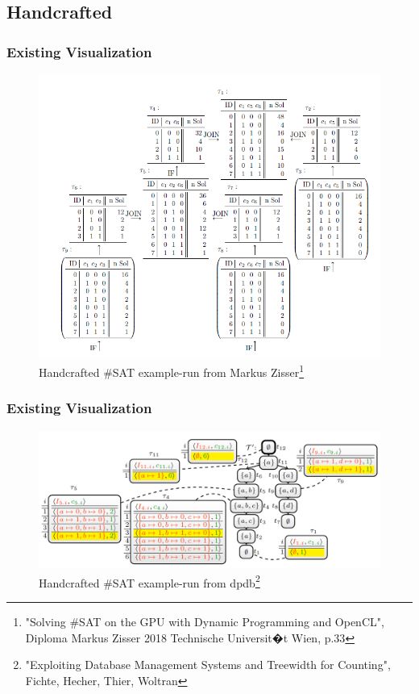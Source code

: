 \documentclass[c,8pt,xcolor...,x11names]{beamer}
\begin{document}
\subsection{Handcrafted}
\begin{frame}
	\frametitle{Existing Visualization}
	\begin{figure}
		\centering
		\includegraphics[width=0.6\linewidth]{images/DualDA43.png}
		\caption{Handcrafted \#SAT example-run from Markus Zisser\footnote{"Solving \#SAT on the GPU with Dynamic Programming and OpenCL",\\ Diploma Markus Zisser 2018 Technische Universit�t Wien, p.33}}
		\label{fig:dualda43}
	\end{figure}
	
\end{frame}
\begin{frame}
	\frametitle{Existing Visualization}
	\begin{figure}
		\centering
		\includegraphics[width=\linewidth]{images/dpdbVisuSat.png}
		\caption{Handcrafted \#SAT example-run from dpdb\footnote{"Exploiting Database Management Systems and Treewidth for Counting",\\ Fichte, Hecher, Thier, Woltran} }
		\label{fig:dpdbVisuSat}
	\end{figure}
	
	
\end{frame}
\end{document}
